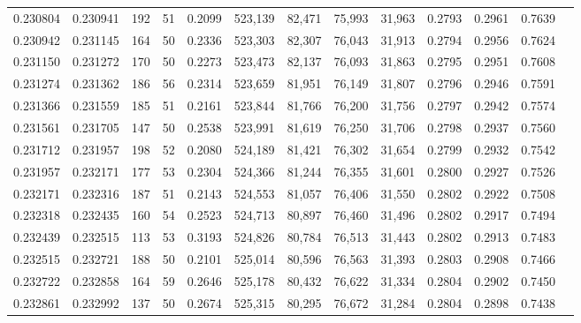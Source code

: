 \begin{tabular}{rrrrrrrrrrrrr}
0.230804 & 0.230941 &   192 &  51 &                                     0.2099 & 523,139 &  82,471 &  75,993 &  31,963 & 0.2793 & 0.2961 & 0.7639 \\
0.230942 & 0.231145 &   164 &  50 &                                     0.2336 & 523,303 &  82,307 &  76,043 &  31,913 & 0.2794 & 0.2956 & 0.7624 \\
0.231150 & 0.231272 &   170 &  50 &                                     0.2273 & 523,473 &  82,137 &  76,093 &  31,863 & 0.2795 & 0.2951 & 0.7608 \\
0.231274 & 0.231362 &   186 &  56 &                                     0.2314 & 523,659 &  81,951 &  76,149 &  31,807 & 0.2796 & 0.2946 & 0.7591 \\
0.231366 & 0.231559 &   185 &  51 &                                     0.2161 & 523,844 &  81,766 &  76,200 &  31,756 & 0.2797 & 0.2942 & 0.7574 \\
0.231561 & 0.231705 &   147 &  50 &                                     0.2538 & 523,991 &  81,619 &  76,250 &  31,706 & 0.2798 & 0.2937 & 0.7560 \\
0.231712 & 0.231957 &   198 &  52 &                                     0.2080 & 524,189 &  81,421 &  76,302 &  31,654 & 0.2799 & 0.2932 & 0.7542 \\
0.231957 & 0.232171 &   177 &  53 &                                     0.2304 & 524,366 &  81,244 &  76,355 &  31,601 & 0.2800 & 0.2927 & 0.7526 \\
0.232171 & 0.232316 &   187 &  51 &                                     0.2143 & 524,553 &  81,057 &  76,406 &  31,550 & 0.2802 & 0.2922 & 0.7508 \\
0.232318 & 0.232435 &   160 &  54 &                                     0.2523 & 524,713 &  80,897 &  76,460 &  31,496 & 0.2802 & 0.2917 & 0.7494 \\
0.232439 & 0.232515 &   113 &  53 &                                     0.3193 & 524,826 &  80,784 &  76,513 &  31,443 & 0.2802 & 0.2913 & 0.7483 \\
0.232515 & 0.232721 &   188 &  50 &                                     0.2101 & 525,014 &  80,596 &  76,563 &  31,393 & 0.2803 & 0.2908 & 0.7466 \\
0.232722 & 0.232858 &   164 &  59 &                                     0.2646 & 525,178 &  80,432 &  76,622 &  31,334 & 0.2804 & 0.2902 & 0.7450 \\
0.232861 & 0.232992 &   137 &  50 &                                     0.2674 & 525,315 &  80,295 &  76,672 &  31,284 & 0.2804 & 0.2898 & 0.7438 \\

\end{tabular}
